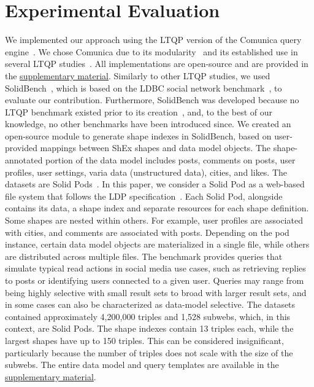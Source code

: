 \section{Experimental Evaluation}\label{sec:experiment}

We implemented our approach using the \ac{LTQP} version of the Comunica query engine~\cite{taelman_iswc_resources_comunica_2018}.
We chose Comunica due to its modularity~\cite{taelman_swj_componentsjs_2022} and its established use in several \ac{LTQP} studies~\cite{Bogaerts2021LinkTW, Taelman2023, eschauzier_quweda_linkqueue_2023, Hanski2024, eschauzier_amw_rcubemetric_2024, tam2024opportunitiesshapebasedoptimizationlink}.
All implementations are open-source and are provided in the \hyperref[sec:supplementalMaterial]{supplementary material}.
Similarly to other \ac{LTQP} studies, we used SolidBench~\cite{Taelman2023}, which is based on the \ac{LDBC} social network benchmark~\cite{Angles2020}, to evaluate our contribution.
Furthermore, SolidBench was developed because no \ac{LTQP} benchmark existed prior to its creation~\cite{hartig2018linked, Taelman2023}, and, to the best of our knowledge, no other benchmarks have been introduced since.
We created an open-source module to generate shape indexes in SolidBench, based on user-provided mappings between \ac{ShEx} shapes and data model objects.
The shape-annotated portion of the data model includes posts, comments on posts, user profiles, user settings, varia data (unstructured data), cities, and likes.
The datasets are Solid Pods~\cite{sambra_solid_2016, dedecker2022s}.
In this paper, we consider a Solid Pod as a web-based file system that follows the \ac{LDP} specification~\cite{w3LinkedData}.
Each Solid Pod, alongside contains its data, a shape index and separate resources for each shape definition.
Some shapes are nested within others. 
For example, user profiles are associated with cities, and comments are associated with posts.
Depending on the pod instance, certain data model objects are materialized in a single file, while others are distributed across multiple files.
The benchmark provides queries that simulate typical read actions in social media use cases, such as retrieving replies to posts or identifying users connected to a given user. 
Queries may range from being highly selective with small result sets to broad with larger result sets, and in some cases can also be characterized as data-model selective.
The datasets contained approximately 4,200,000 triples and 1,528 subwebs, which, in this context, are Solid Pods.
The shape indexes contain 13 triples each, while the largest shapes have up to 150 triples. 
This can be considered insignificant, particularly because the number of triples does not scale with the size of the subwebs.
The entire data model and query templates are available in the \hyperref[sec:supplementalMaterial]{supplementary material}.

